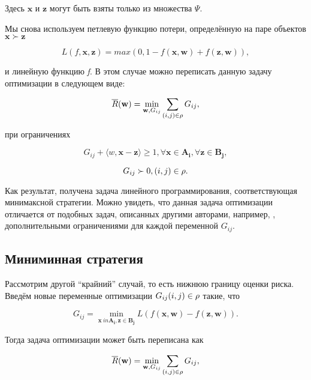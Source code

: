 \documentclass[12pt,a4paper,oneside]{article}
\begin{document}
\par
Здесь \(\mathbf{x}\) и \(\mathbf{z}\) могут быть взяты только из множества \(\Psi\). 

\par
Мы снова используем петлевую функцию потери, определённую на паре объектов \(\mathbf{x} \succ \mathbf{z}\)

\[
L(f, \mathbf{x}, \mathbf{z}) = max (0,1 - f(\mathbf{x}, \mathbf{w}) + f(\mathbf{z}, \mathbf{w})),
\]

\par
и линейную функцию \emph{f}. 
В этом случае можно переписать данную задачу оптимизации в следующем виде:

\[
\overline{R}(\mathbf{w}) = \underset{\mathbf{w}, G_{ij}}{\operatorname{min}} \sum \limits_{(i, j) \in \mathrm{\rho}} G_{ij},
\]

\par
при ограничениях

\[
G_{ij} + \langle w, \mathbf{x} - \mathbf{z} \rangle \geq 1, \forall \mathbf{x} \in \mathbf{A_i}, \forall \mathbf{z} \in \mathbf{B_j}, 
\]

\[
G_{ij} \succ 0, (i, j) \in \mathrm{\rho}.
\]

\par
Как результат, получена задача линейного программирования, соответствующая минимаксной стратегии. 
Можно увидеть, что данная задача оптимизации отличается от подобных задач, описанных другими авторами, например, , дополнительными ограничениями для каждой переменной \(G_{ij}\). 


\subsection{Миниминная стратегия}

\par
Рассмотрим другой ``крайний'' случай, то есть нижнюю границу оценки риска. 
Введём новые переменные оптимизации \(G_{ij} (i, j) \in \mathrm{\rho}\) такие, что

\[
G_{ij} = \underset{\mathbf{x} \ in \mathbf{A_i}, \mathbf{z} \in \mathbf{B_j}}{\operatorname{min}} L ( f(\mathbf{x}, \mathbf{w}) - f(\mathbf{z}, \mathbf{w})). 
\]

\par
Тогда задача оптимизации может быть переписана как

\[
\overline{R}(\mathbf{w}) = \underset{\mathbf{w}, G_{ij}}{\operatorname{min}} \sum \limits_{(i, j) \in \mathrm{\rho}} G_{ij},
\]
\end{document}
